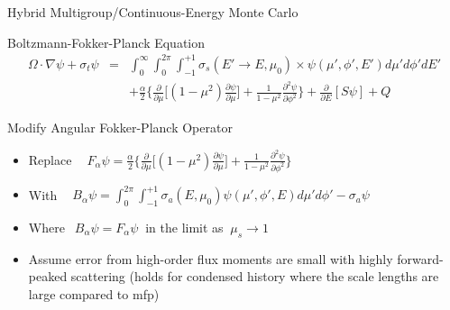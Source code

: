 \documentclass{beamer}
\begin{document}
\begin{frame}{Hybrid Multigroup/Continuous-Energy Monte Carlo}
 
  \begin{block}{ Boltzmann-Fokker-Planck Equation}
    \begin{eqnarray*}
      \Omega \cdot \nabla \psi + \sigma_t\psi &=& \int_{0}^{\infty}\int_{0}^{2\pi}\int_{-1}^{+1} \sigma_s(E'\rightarrow E,\mu_0)
       \times\psi(\mu',\phi',E')d\mu'd\phi'dE' \\
       & &+ \frac{\alpha}{2}\Big\{ \frac{\partial}{\partial \mu} \Big[(1-\mu^2)\frac{\partial \psi}{\partial \mu}\Big]+ \frac{1}{1-\mu^2}\frac{\partial^2\psi}{\partial\phi^2}\Big\} + \frac{\partial}{\partial E} [S\psi]+Q
    \end{eqnarray*}
   \end{block}
    
  \begin{block}{Modify Angular Fokker-Planck Operator}
    \begin{itemize}
      \item Replace $~~~~F_{\alpha}\psi=\frac{\alpha}{2}\Big\{ \frac{\partial}{\partial \mu} 
        \Big[(1-\mu^2)\frac{\partial \psi}{\partial \mu}\Big]+ \frac{1}{1-\mu^2}\frac{\partial^2\psi}{\partial\phi^2}\Big\}$
      
      \item With $~~~~B_{\alpha}\psi=\int_{0}^{2\pi}\int_{-1}^{+1} \sigma_a(E,\mu_0)\psi(\mu',\phi',E)d\mu'd\phi' - \sigma_a\psi$
        
      \item Where $~~B_{\alpha}\psi = F_{\alpha}\psi~$ in the limit as $~\mu_s \rightarrow 1$
      \item Assume error from high-order flux moments are small with highly forward-peaked scattering (holds for condensed history where the scale lengths are large compared to mfp)
    \end{itemize}
  \end{block}

\end{frame}
\end{document}
